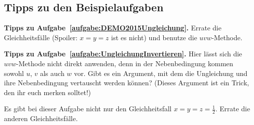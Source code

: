\subsection*{Tipps zu den Beispielaufgaben}
\textbf{Tipps zu Aufgabe~\ref{aufgabe:DEMO2015Ungleichung}.} Errate die Gleichheitsfälle (Spoiler: $x=y=z$ ist es nicht) und benutze die $uvw$-Methode.	

\textbf{Tipps zu Aufgabe~\ref{aufgabe:UngleichungInvertieren}.} Hier lässt sich die $uvw$-Methode nicht direkt anwenden, denn in der Nebenbedingung kommen sowohl $u$, $v$ als auch $w$ vor. Gibt es ein Argument, mit dem die Ungleichung und ihre Nebenbedingung vertauscht werden können? (Dieses Argument ist ein Trick, den ihr euch merken solltet!)

Es gibt bei dieser Aufgabe nicht nur den Gleichheitsfall $x=y=z=\frac12$. Errate die anderen Gleichheitsfälle.